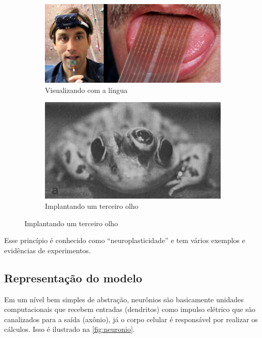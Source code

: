 \begin{figure}
  \caption{Exemplos de representação de sensores no cérebro}
  \begin{subfigure}[htb]{0.5\textwidth} 
    \includegraphics[width=\textwidth]{img/seeingtongue}
    \caption{Visualizando com a língua} \label{fig:vendocomalingua}
  \end{subfigure} 
  \begin{subfigure}[htb]{0.41\textwidth}
    \includegraphics[width=\textwidth]{img/thirdeye}
    \caption{Implantando um terceiro olho} \label{fig:terceiroolho}
  \end{subfigure} 

\end{figure}

Esse princípio é conhecido como ``neuroplasticidade'' e tem vários exemplos e evidências de experimentos.

\subsection{Representação do modelo}

Em um nível bem simples de abstração, neurônios são basicamente unidades computacionais que recebem entradas (dendritos) como impulso elétrico que são canalizados para a saída (axônio), já o corpo celular é responsável por realizar os cálculos. Isso é ilustrado na \autoref{fig:neuronio}.

